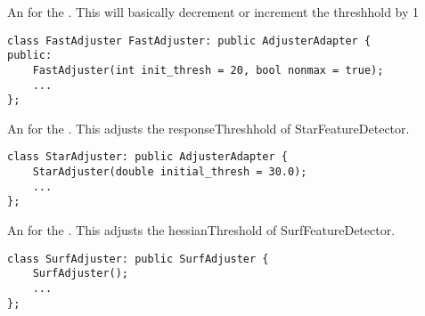 An  for the . This will basically decrement or increment the
threshhold by 1

\begin{lstlisting}
class FastAdjuster FastAdjuster: public AdjusterAdapter {
public:
	FastAdjuster(int init_thresh = 20, bool nonmax = true);
	...
};
\end{lstlisting}

An  for the .  This adjusts the responseThreshhold of 
StarFeatureDetector.
\begin{lstlisting}
class StarAdjuster: public AdjusterAdapter {
	StarAdjuster(double initial_thresh = 30.0);
	...
};
\end{lstlisting}


An  for the .  This adjusts the hessianThreshold of 
SurfFeatureDetector.
\begin{lstlisting}
class SurfAdjuster: public SurfAdjuster {
	SurfAdjuster();
	...
};
\end{lstlisting}

